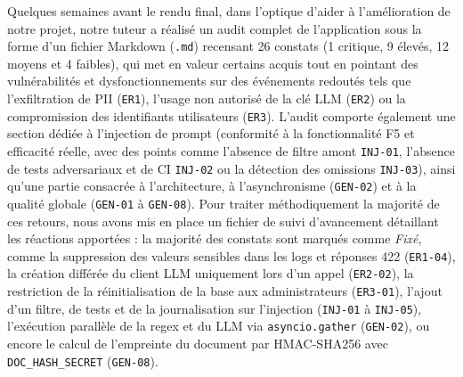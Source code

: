 \documentclass[12pt,a4paper]{article}
\begin{document}
Quelques semaines avant le rendu final, dans l'optique d'aider à l'amélioration de notre projet, notre tuteur a réalisé un audit complet de l'application sous la forme d'un fichier Markdown (\texttt{.md}) recensant 26 constats (1 critique, 9 élevés, 12 moyens et 4 faibles), qui met en valeur certains acquis tout en pointant des vulnérabilités et dysfonctionnements sur des événements redoutés tels que l'exfiltration de PII (\texttt{ER1}), l'usage non autorisé de la clé LLM (\texttt{ER2}) ou la compromission des identifiants utilisateurs (\texttt{ER3}). L'audit comporte également une section dédiée à l'injection de prompt (conformité à la fonctionnalité F5 et efficacité réelle, avec des points comme l'absence de filtre amont \texttt{INJ-01}, l'absence de tests adversariaux et de CI \texttt{INJ-02} ou la détection des omissions \texttt{INJ-03}), ainsi qu'une partie consacrée à l'architecture, à l'asynchronisme (\texttt{GEN-02}) et à la qualité globale (\texttt{GEN-01} à \texttt{GEN-08}). Pour traiter méthodiquement la majorité de ces retours, nous avons mis en place un fichier de suivi d'avancement détaillant les réactions apportées : la majorité des constats sont marqués comme \textit{Fixé}, comme la suppression des valeurs sensibles dans les logs et réponses 422 (\texttt{ER1-04}), la création différée du client LLM uniquement lors d'un appel (\texttt{ER2-02}), la restriction de la réinitialisation de la base aux administrateurs (\texttt{ER3-01}), l'ajout d'un filtre, de tests et de la journalisation sur l'injection (\texttt{INJ-01} à \texttt{INJ-05}), l'exécution parallèle de la regex et du LLM via \texttt{asyncio.gather} (\texttt{GEN-02}), ou encore le calcul de l'empreinte du document par HMAC-SHA256 avec \texttt{DOC\_HASH\_SECRET} (\texttt{GEN-08}).
\end{document}
